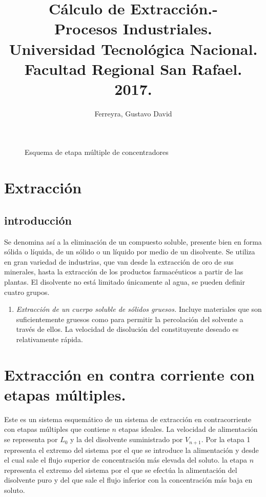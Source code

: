 \documentclass[12pt]{article}
\title{Cálculo de Extracción.-\\ Procesos Industriales.\\ Universidad Tecnológica Nacional.\\ Facultad Regional San Rafael.\\ 2017.}
\author{Ferreyra, Gustavo David}
\date{}
\begin{document}
\maketitle
\newpage
\begin{figure}
\center
\tiny  

\caption{Esquema de etapa múltiple de concentradores}
\end{figure}

\section{Extracción}
\subsection{introducción}

Se denomina así a la eliminación de un compuesto soluble, presente bien en forma sólida o líquida,
 de un sólido o un líquido por medio de un disolvente. Se utiliza en gran variedad de industrias,
 que van desde la extracción de oro de sus minerales, hasta la extracción de los productos 
 farmacéuticos a partir de las plantas. El disolvente no está limitado únicamente al agua, se pueden definir
 cuatro grupos.
 \begin{enumerate}
    \item \textit{Extracción de un cuerpo soluble de sólidos gruesos.} Incluye materiales que son
    suficientemente gruesos como para permitir la percolación del solvente a través de ellos. La velocidad de 
    disolución del constituyente deseado es relativamente rápida.
 \end{enumerate}

\section{Extracción en contra corriente con etapas múltiples.}

Este es un sistema esquemático de un sistema de extracción en contracorriente con etapas múltiples que contiene $n$ etapas ideales. La velocidad de alimentación se representa por $L_0$ y la del disolvente suministrado por $V_{n+1}$. Por la etapa 1 representa el extremo del sistema por el que se introduce la alimentación y desde el cual sale el flujo superior de concentración más elevada del soluto. la etapa $n$ representa el extremo del sistema por el que se efectúa la alimentación del disolvente puro y del que sale el flujo inferior con la concentración más baja en soluto.
  
\end{document}
